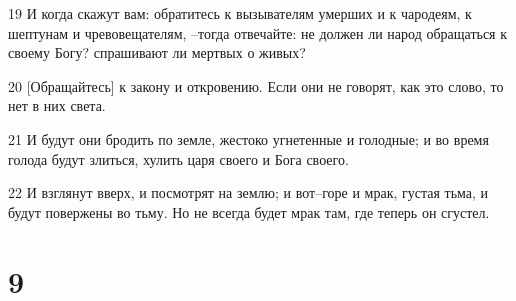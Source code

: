 \par 19 И когда скажут вам: обратитесь к вызывателям умерших и к чародеям, к шептунам и чревовещателям, --тогда отвечайте: не должен ли народ обращаться к своему Богу? спрашивают ли мертвых о живых?
\par 20 [Обращайтесь] к закону и откровению. Если они не говорят, как это слово, то нет в них света.
\par 21 И будут они бродить по земле, жестоко угнетенные и голодные; и во время голода будут злиться, хулить царя своего и Бога своего.
\par 22 И взглянут вверх, и посмотрят на землю; и вот--горе и мрак, густая тьма, и будут повержены во тьму. Но не всегда будет мрак там, где теперь он сгустел.

\chapter{9}


